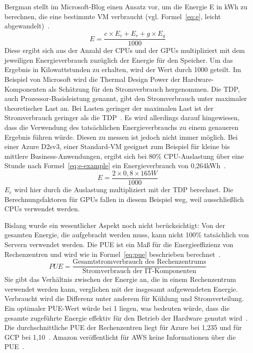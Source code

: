 Bergman stellt im Microsoft-Blog einen Ansatz vor, um die Energie E in kWh zu berechnen, die eine bestimmte \ac{VM} verbraucht (vgl. Formel~\ref{eq:e}, leicht abgewandelt)~\cite{Bergman.15.2.2021}.
\begin{equation}
 \label{eq:e}
 E = \frac{c \times E_c + E_r + g \times E_g}{1000}
\end{equation}
Diese ergibt sich aus der Anzahl der \acp{CPU} und der \acp{GPU} multipliziert mit dem jeweiligen Energieverbrauch zuzüglich der Energie für den Speicher.
Um das Ergebnis in Kilowattstunden zu erhalten, wird der Wert durch 1000 geteilt.
Im Beispiel von Microsoft wird die Thermal Design Power der Hardware-Komponenten als Schätzung für den Stromverbrauch hergenommen.
Die \ac{TDP}, auch Prozessor-Basisleistung genannt, gibt den Stromverbrauch unter maximaler theoretischer Last an.
Bei Lasten geringer der maximalen Last ist der Stromverbrauch geringer als die \ac{TDP}~\cite{Intel.20240317}.
Es wird allerdings darauf hingewiesen, dass die Verwendung des tatsächlichen Energieverbrauchs zu einem genaueren Ergebnis führen würde.
Diesen zu messen ist jedoch nicht immer möglich.
Bei einer Azure D2sv3, einer Standard-\ac{VM} geeignet zum Beispiel für kleine bis mittlere Business-Anwendungen, ergibt sich bei 80\% \ac{CPU}-Auslastung über eine Stunde nach Formel~\ref{eq:e-example} ein Energieverbrauch von 0,264kWh~\cite{Bergman.15.2.2021}.
\begin{equation}
 \label{eq:e-example}
 E = \frac{2 \times 0,8 \times 165W}{1000}
\end{equation}
$E_c$ wird hier durch die Auslastung multipliziert mit der \ac{TDP} berechnet.
Die Berechnungsfaktoren für \acp{GPU} fallen in diesem Beispiel weg, weil ausschließlich \acp{CPU} verwendet werden.

Bislang wurde ein wesentlicher Aspekt noch nicht berücksichtigt:
Von der gesamten Energie, die aufgebracht werden muss, kann nicht 100\% tatsächlich von Servern verwendet werden.
Die \ac{PUE} ist ein Maß für die Energieeffizienz von Rechenzentren und wird wie in Formel~\ref{eq:pue} beschrieben berechnet~\cite{Walsh.22.4.2022}.
\begin{equation}
 \label{eq:pue}
 PUE = \frac{\text{Gesamtstromverbrauch des Rechenzentrums}}{\text{Stromverbrauch der IT-Komponenten}}
\end{equation}
Sie gibt das Verhältnis zwischen der Energie an, die in einem Rechenzentrum verwendet werden kann, verglichen mit der insgesamt aufgewendeten Energie.
Verbraucht wird die Differenz unter anderem für Kühlung und Stromverteilung.
Ein optimaler \ac{PUE}-Wert würde bei 1 liegen, was bedeuten würde, dass die gesamte zugeführte Energie effektiv für den Betrieb der Hardware genutzt wird~\cite{GreenSoftwareFoundation.2022}.
Die durchschnittliche \ac{PUE} der Rechenzentren liegt für Azure bei 1,235 und für \ac{GCP} bei 1,10~\cite{Walsh.22.4.2022}\cite{Google.20240312}.
Amazon veröffentlicht für \ac{AWS} keine Informationen über die \ac{PUE}~\cite{Cockcroft.18.7.2023}.


